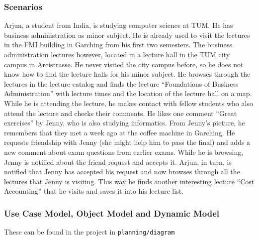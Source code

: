 \documentclass[a4paper,12pt,halfparskip]{scrartcl}
\newenvironment{subs}
{\adjustwidth{3em}{0pt}}
{\endadjustwidth}
\newenvironment{subsubs}
{\adjustwidth{2em}{0pt}}
{\endadjustwidth}
\begin{document}
\begin{subs}
\begin{subsubs}
            \subsubsection{Scenarios}
            Arjun, a student from India, is studying computer science at TUM. He has business
            administration as minor subject.
            He is already used to visit the lectures in the FMI building
            in Garching from his first two semesters.
            The business administration lectures however,
            located in a lecture hall in the TUM city campus in Arcistrasse.
            He never visited the city
            campus before, so he does not know how to find the lecture halls for his minor subject.
            He browses through the lectures in the lecture catalog and finds the lecture “Foundations of
            Business Administration” with lecture times and the location of the lecture hall on a map.
            While he is attending the lecture, he makes contact with fellow students who also attend the
            lecture and checks their comments.
            He likes one comment “Great exercises” by Jenny, who
            is also studying informatics.
            From Jenny’s picture, he remembers that they met a week ago
            at the coffee machine in Garching.
            He requests friendship with Jenny (she might help him
            to pass the final) and adds a new comment about exam questions from earlier exams.
            While
            he is browsing, Jenny is notified about the friend request and accepts it.
            Arjun, in turn, is
            notified that Jenny has accepted his request and now browses through all the lectures that
            Jenny is visiting.
            This way he finds another interesting lecture “Cost Accounting” that he
            visits and saves it into his lecture list.

            \subsubsection{Use Case Model, Object Model and Dynamic Model}
            These can be found in the project in \texttt{planning/diagram}
        \end{subsubs}
    \end{subs}
\end{document}
